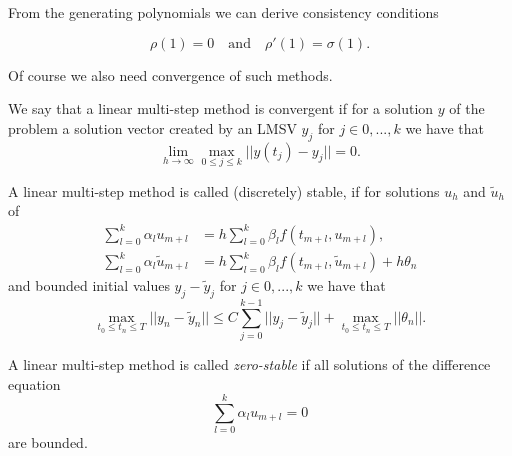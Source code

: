	From the generating polynomials we can derive consistency conditions
	
	\begin{displaymath}
		\rho(1) = 0 \quad \text{and} \quad \rho'(1) = \sigma(1).
	\end{displaymath}

	Of course we also need convergence of such methods.
	
	\begin{definition} \label{def: LMSV convergence}
		We say that a linear multi-step method is convergent if for a solution $y$ of the problem a solution vector created by an LMSV $y_j$ for $j \in {0,...,k}$ we have that
		\begin{displaymath}
			\lim\limits_{h \to \infty} \max_{0 \leq j \leq k} ||y(t_j) - y_j|| = 0.
		\end{displaymath}
	\end{definition}
	
	
	\begin{definition} \label{discrete stability LMSM}
		A linear multi-step method is called (discretely) stable, if for solutions $u_h$ and $\tilde{u}_h$ of
		\begin{align}
			\sum_{l=0}^{k} \alpha_l u_{m+l} &= h \sum_{l=0}^{k} \beta_l f(t_{m+l}, u_{m+l}), \\
			\sum_{l=0}^{k} \alpha_l \tilde{u}_{m+l} &= h \sum_{l=0}^{k} \beta_l f(t_{m+l}, \tilde{u}_{m+l}) + h\theta_n
		\end{align} 
		and bounded initial values $y_j - \tilde{y}_j$ for $j \in {0,...,k}$ we have that
		\begin{displaymath}
			\max_{t_0 \leq t_n \leq T} ||y_n - \tilde{y}_n|| \leq C \sum_{j=0}^{k-1} ||y_j - \tilde{y}_j|| + \max_{t_0 \leq t_n \leq T} ||\theta_n||.
		\end{displaymath}
	\end{definition}
	
	\begin{definition}
		A linear multi-step method is called \emph{zero-stable} if all solutions of the difference equation
		\begin{displaymath}
			\sum_{l=0}^{k} \alpha_l u_{m+l} = 0
		\end{displaymath}
		are bounded.
	\end{definition}
	
